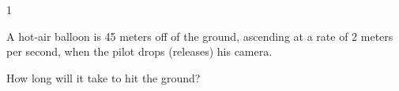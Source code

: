 
\AddToShipoutPicture*{\BackgroundPic}

\addtocounter {ProbNum} {1}

 
{\bf \Large{}} A hot-air balloon is 45 meters off of the ground, ascending at a rate of 2 meters per second, when the pilot drops (releases) his camera.  \bigskip

How long will it take to hit the ground?\paragraph{}
\noindent
\vfill




\newpage